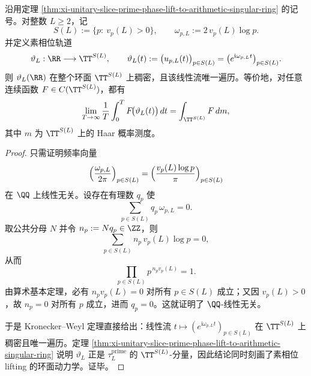 \begin{theorem}\label{thm:xi-prime-phase-torus-dense-uniquely-ergodic}
沿用定理 \ref{thm:xi-unitary-slice-prime-phase-lift-to-arithmetic-singular-ring} 的记号。对整数 \(L\ge 2\)，记
\[
S(L):=\{p:\ v_p(L)>0\},
\qquad
\omega_{p,L}:=2\,v_p(L)\log p.
\]
并定义素相位轨道
\[
\vartheta_L:\RR\longrightarrow \TT^{S(L)},
\qquad
\vartheta_L(t):=\bigl(u_{p,L}(t)\bigr)_{p\in S(L)}
=\bigl(e^{\mathrm{i}\omega_{p,L}t}\bigr)_{p\in S(L)}.
\]
则 \(\vartheta_L(\RR)\) 在整个环面 \(\TT^{S(L)}\) 上稠密，且该线性流唯一遍历。等价地，对任意连续函数 \(F\in C(\TT^{S(L)})\)，都有
\[
\lim_{T\to\infty}\frac1T\int_0^T F\!\bigl(\vartheta_L(t)\bigr)\,dt
=
\int_{\TT^{S(L)}}F\,dm,
\]
其中 \(m\) 为 \(\TT^{S(L)}\) 上的 Haar 概率测度。
\end{theorem}
\begin{proof}
只需证明频率向量
\[
\Bigl(\frac{\omega_{p,L}}{2\pi}\Bigr)_{p\in S(L)}
=
\Bigl(\frac{v_p(L)\log p}{\pi}\Bigr)_{p\in S(L)}
\]
在 \(\QQ\) 上线性无关。设存在有理数 \(q_p\) 使
\[
\sum_{p\in S(L)} q_p\,\omega_{p,L}=0.
\]
取公共分母 \(N\) 并令 \(n_p:=Nq_p\in\ZZ\)，则
\[
\sum_{p\in S(L)} n_p\,v_p(L)\log p=0,
\]
从而
\[
\prod_{p\in S(L)}p^{\,n_p v_p(L)}=1.
\]
由算术基本定理，必有 \(n_p v_p(L)=0\) 对所有 \(p\in S(L)\) 成立；又因 \(v_p(L)>0\)，故 \(n_p=0\) 对所有 \(p\) 成立，进而 \(q_p=0\)。这就证明了 \(\QQ\)-线性无关。

于是 Kronecker--Weyl 定理直接给出：线性流 \(t\mapsto (e^{\mathrm{i}\omega_{p,L}t})_{p\in S(L)}\) 在 \(\TT^{S(L)}\) 上稠密且唯一遍历。定理 \ref{thm:xi-unitary-slice-prime-phase-lift-to-arithmetic-singular-ring} 说明 \(\vartheta_L\) 正是 \(\tau_L^{\mathrm{prime}}\) 的 \(\TT^{S(L)}\)-分量，因此结论同时刻画了素相位 lifting 的环面动力学。证毕。
\end{proof}


